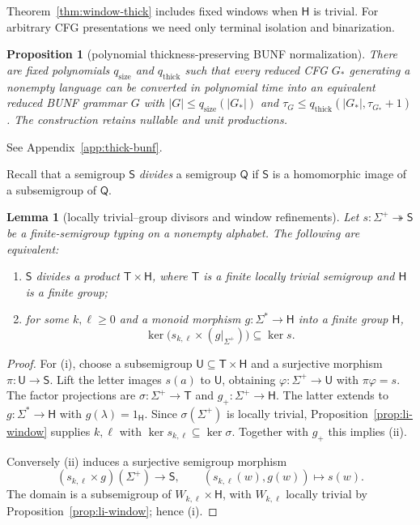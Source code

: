 \documentclass[11pt,a4paper]{article}
\newtheorem{lemma}[theorem]{Lemma}
\newtheorem{proposition}[theorem]{Proposition}
\theoremstyle{remark}
\theoremstyle{plain}
\begin{document}
Theorem~\ref{thm:window-thick} includes fixed windows
when $\mathsf H$ is trivial. For arbitrary CFG presentations
we need only terminal isolation and binarization.

\begin{proposition}[polynomial thickness-preserving BUNF normalization]
\label{prop:thick-bunf-normal}
There are fixed polynomials $q_{\mathrm{size}}$ and
$q_{\mathrm{thick}}$ such that every reduced CFG $G_*$
generating a nonempty language can be converted in
polynomial time into an equivalent reduced BUNF grammar $G$
with
$|G|\le q_{\mathrm{size}}(|G_*|)$ and
$\tau_G\le q_{\mathrm{thick}}(|G_*|,\tau_{G_*}+1)$.
The construction retains nullable and unit productions.
\end{proposition}
See Appendix~\ref{app:thick-bunf}.

Recall that a semigroup $\mathsf S$ \emph{divides} a semigroup $\mathsf Q$
if $\mathsf S$ is a homomorphic image of a subsemigroup of $\mathsf Q$.

\begin{lemma}[locally trivial--group divisors and window refinements]
\label{lem:li-group-factor}
Let $s:\Sigma^+\twoheadrightarrow\mathsf S$
be a finite-semigroup typing on a nonempty alphabet.
The following are equivalent:
\begin{enumerate}[label=\textup{(\roman*)},nosep]
\item $\mathsf S$ divides a product $\mathsf T\times\mathsf H$,
where $\mathsf T$ is a finite locally trivial semigroup
and $\mathsf H$ is a finite group;
\item for some $k,\ell\ge0$ and a monoid morphism
$g:\Sigma^*\to\mathsf H$ into a finite group $\mathsf H$,
\[
\ker\bigl(s_{k,\ell}\times(g|_{\Sigma^+})\bigr)
\subseteq\ker s.
\]
\end{enumerate}
\end{lemma}
\begin{proof}
For (i), choose a subsemigroup
$\mathsf U\subseteq\mathsf T\times\mathsf H$ and a surjective
morphism $\pi:\mathsf U\to\mathsf S$. Lift the letter images
$s(a)$ to $\mathsf U$, obtaining $\varphi:\Sigma^+\to\mathsf U$
with $\pi\varphi=s$. The factor projections are
$\sigma:\Sigma^+\to\mathsf T$ and
$g_+:\Sigma^+\to\mathsf H$. The latter extends
to $g:\Sigma^*\to\mathsf H$ with
$g(\lambda)=1_{\mathsf H}$. Since
$\sigma(\Sigma^+)$ is locally trivial,
Proposition~\ref{prop:li-window} supplies
$k,\ell$ with $\ker s_{k,\ell}\subseteq\ker\sigma$.
Together with $g_+$ this implies (ii).

Conversely (ii) induces a surjective semigroup morphism
\[
(s_{k,\ell}\times g)(\Sigma^+)\longrightarrow\mathsf S,
\qquad(s_{k,\ell}(w),g(w))\longmapsto s(w).
\]
The domain is a subsemigroup of
$W_{k,\ell}\times\mathsf H$, with $W_{k,\ell}$
locally trivial by Proposition~\ref{prop:li-window};
hence (i).
\end{proof}
\end{document}
